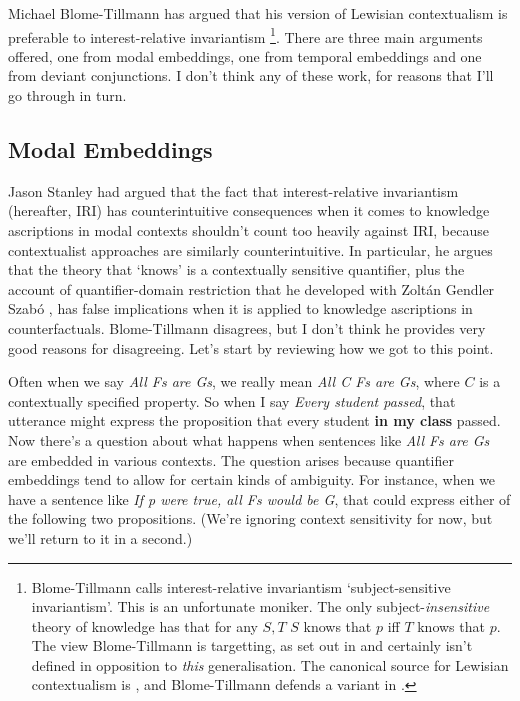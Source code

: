 \noindent Michael Blome-Tillmann has argued that his version of Lewisian contextualism is preferable to interest-relative invariantism \citep{MBT2009}\footnote{Blome-Tillmann calls interest-relative invariantism `subject-sensitive invariantism'. This is an unfortunate moniker. The only subject-\textit{insensitive} theory of knowledge has that for any \(S, T\) $S$ knows that $p$ iff $T$ knows that $p$. The view Blome-Tillmann is targetting, as set out in \cite{Fantl2002, Hawthorne2004, Stanley2005-STAKAP} and \cite{Weatherson2005-WEACWD} certainly isn't defined in opposition to \textit{this} generalisation. The canonical source for Lewisian contextualism is \cite{Lewis1996b}, and Blome-Tillmann defends a variant in \cite{MBT2009a}.}. There are three main arguments offered, one from modal embeddings, one from temporal embeddings and one from deviant conjunctions. I don't think any of these work, for reasons that I'll go through in turn.

\subsection{Modal Embeddings}
Jason Stanley had argued that the fact that interest-relative invariantism (hereafter, IRI) has counterintuitive consequences when it comes to knowledge ascriptions in modal contexts shouldn't count too heavily against IRI, because contextualist approaches are similarly counterintuitive. In particular, he argues that the theory that `knows' is a contextually sensitive quantifier, plus the account of quantifier-domain restriction that he developed with Zolt\'{a}n Gendler Szab\'{o} \citep{Stanley2000-STAOQD}, has false implications when it is applied to knowledge ascriptions in counterfactuals. Blome-Tillmann disagrees, but I don't think he provides very good reasons for disagreeing. Let's start by reviewing how we got to this point.

Often when we say \textit{All Fs are Gs}, we really mean \textit{All C Fs are Gs}, where $C$ is a contextually specified property. So when I say \textit{Every student passed}, that utterance might express the proposition that every student \textbf{in my class} passed. Now there's a question about what happens when sentences like \textit{All Fs are Gs} are embedded in various contexts. The question arises because quantifier embeddings tend to allow for certain kinds of ambiguity. For instance, when we have a sentence like \textit{If p were true, all Fs would be G}, that could express either of the following two propositions. (We're ignoring context sensitivity for now, but we'll return to it in a second.)

